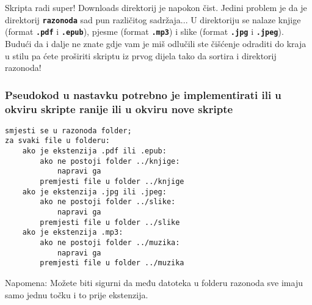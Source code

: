 \documentclass[12pt,a4paper]{article}
\newcommand{\shell}[1]{\texttt{\textbf{#1}}}
\begin{document}
    Skripta radi super! Downloads direktorij je napokon čist. Jedini problem
    je da je direktorij \shell{razonoda} sad pun različitog sadržaja... U
    direktoriju se nalaze knjige (format \shell{.pdf} i \shell{.epub}), pjesme
    (format \shell{.mp3}) i  slike (format \shell{.jpg} i \shell{.jpeg}).
    Budući da i dalje ne znate gdje vam je miš odlučili ste čišćenje odraditi
    do kraja u stilu pa ćete proširiti skriptu iz prvog dijela tako da sortira
    i direktorij razonoda!

    \subsubsection*{Pseudokod u nastavku potrebno je implementirati ili u okviru
    skripte ranije ili u okviru nove skripte}
\begin{verbatim}
smjesti se u razonoda folder;
za svaki file u folderu:
    ako je ekstenzija .pdf ili .epub:
        ako ne postoji folder ../knjige:
            napravi ga
        premjesti file u folder ../knjige
    ako je ekstenzija .jpg ili .jpeg:
        ako ne postoji folder ../slike:
            napravi ga
        premjesti file u folder ../slike
    ako je ekstenzija .mp3:
        ako ne postoji folder ../muzika:
            napravi ga
        premjesti file u folder ../muzika
\end{verbatim}

    Napomena: Možete biti sigurni da među datoteka u folderu razonoda sve imaju samo
    jednu točku i to prije ekstenzija.
\end{document}

